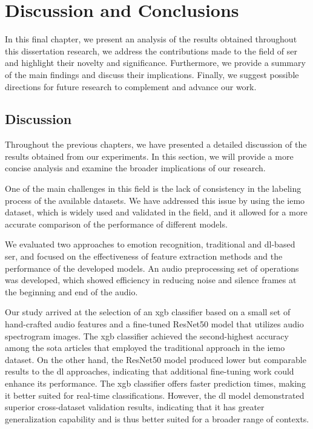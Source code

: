 \chapter{Discussion and Conclusions}
\label{chapter:conc}

In this final chapter, we present an analysis of the results obtained throughout this dissertation research, we address the contributions made to the field of \ac{ser} and highlight their novelty and significance. Furthermore, we provide a summary of the main findings and discuss their implications. Finally, we suggest possible directions for future research to complement and advance our work.

\section{Discussion}

Throughout the previous chapters, we have presented a detailed discussion of the results obtained from our experiments. In this section, we will provide a more concise analysis and examine the broader implications of our research.

One of the main challenges in this field is the lack of consistency in the labeling process of the available datasets. We have addressed this issue by using the \ac{iemo} dataset, which is widely used and validated in the field, and it allowed for a more accurate comparison of the performance of different models.

We evaluated two approaches to emotion recognition, traditional and \ac{dl}-based \ac{ser}, and focused on the effectiveness of feature extraction methods and the performance of the developed models. An audio preprocessing set of operations was developed, which showed efficiency in reducing noise and silence frames at the beginning and end of the audio.

Our study arrived at the selection of an \ac{xgb} classifier based on a small set of hand-crafted audio features and a fine-tuned ResNet50 model that utilizes audio spectrogram images. The \ac{xgb} classifier achieved the second-highest accuracy among the \ac{sota} articles that employed the traditional approach in the \ac{iemo} dataset. On the other hand, the ResNet50 model produced lower but comparable results to the \ac{dl} approaches, indicating that additional fine-tuning work could enhance its performance. The \ac{xgb} classifier offers faster prediction times, making it better suited for real-time classifications. However, the \ac{dl} model demonstrated superior cross-dataset validation results, indicating that it has greater generalization capability and is thus better suited for a broader range of contexts.

